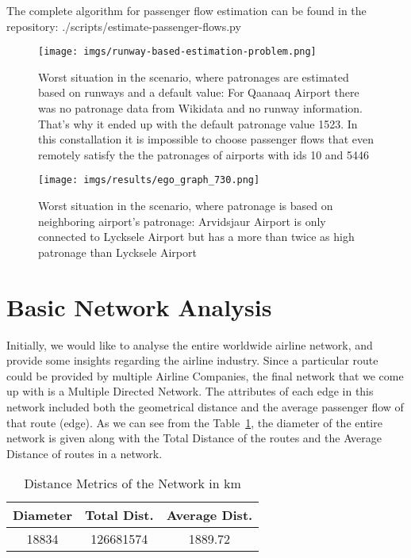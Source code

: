 \documentclass[twocolumn]{tum-article}
\begin{document}
The complete algorithm for passenger flow estimation can be found in the repository: ./scripts/estimate-passenger-flows.py

\begin{figure}[h]
	\centering
	\texttt{[image: imgs/runway-based-estimation-problem.png]}
	\caption{Worst situation in the scenario, where patronages are estimated based on runways and a default value: 
For Qaanaaq Airport there was no patronage data from Wikidata and no runway information. That's why it ended up with the default patronage value 1523. In this constallation it is impossible to choose passenger flows that even remotely satisfy the the patronages of airports with ids 10 and 5446}
	\label{fig:impossible_flows}
\end{figure}

\begin{figure}[h]

	\centering
	\texttt{[image: imgs/results/ego\_graph\_730.png]}
	\caption{Worst situation in the scenario, where patronage is based on neighboring airport's patronage: 
Arvidsjaur Airport is only connected to Lycksele Airport but has a more than twice as high patronage than Lycksele Airport}
	\label{fig:worst_flow_fit}
\end{figure}



\section{Basic Network Analysis}
Initially, we would like to analyse the entire worldwide airline network, and provide some insights regarding the airline industry.
Since a particular route could be provided by multiple Airline Companies, the final network that we come up with is a Multiple Directed Network.
The attributes of each edge in this network included both the geometrical distance and the average passenger flow of that route (edge). 
As we can see from the Table~\ref{Tab:distance_metrics}, the diameter of the entire network is given along with the Total Distance of the routes and the Average Distance of routes in a network.  

\begin{center}
\begin{table}[ht]	
 \begin{tabular}{| c | c | c |}
 \hline
 \textbf{Diameter} & \textbf{Total Dist.} & \textbf{Average Dist.} \\ 
 \hline
 18834 & 126681574 & 1889.72 \\
 \hline
 \end{tabular}
\caption{Distance Metrics of the Network in km}
\label{Tab:distance_metrics}	 
\end{table}
\end{center}
\end{document}
